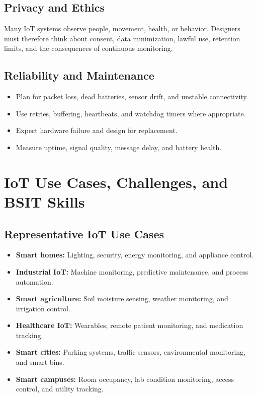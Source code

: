 \documentclass[11pt,a4paper]{article}
\begin{document}
\subsection{Privacy and Ethics}

\begin{conceptbox}
Many IoT systems observe people, movement, health, or behavior. Designers must therefore think about consent, data minimization, lawful use, retention limits, and the consequences of continuous monitoring.
\end{conceptbox}

\subsection{Reliability and Maintenance}

\begin{itemize}[leftmargin=*]
  \item Plan for packet loss, dead batteries, sensor drift, and unstable connectivity.
  \item Use retries, buffering, heartbeats, and watchdog timers where appropriate.
  \item Expect hardware failure and design for replacement.
  \item Measure uptime, signal quality, message delay, and battery health.
\end{itemize}

\section{IoT Use Cases, Challenges, and BSIT Skills}

\subsection{Representative IoT Use Cases}

\begin{itemize}[leftmargin=*]
  \item \textbf{Smart homes:} Lighting, security, energy monitoring, and appliance control.
  \item \textbf{Industrial IoT:} Machine monitoring, predictive maintenance, and process automation.
  \item \textbf{Smart agriculture:} Soil moisture sensing, weather monitoring, and irrigation control.
  \item \textbf{Healthcare IoT:} Wearables, remote patient monitoring, and medication tracking.
  \item \textbf{Smart cities:} Parking systems, traffic sensors, environmental monitoring, and smart bins.
  \item \textbf{Smart campuses:} Room occupancy, lab condition monitoring, access control, and utility tracking.
\end{itemize}
\end{document}
